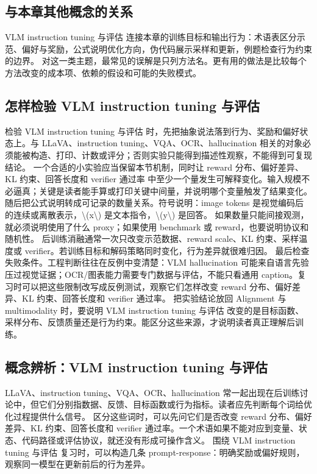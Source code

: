 \documentclass[a4paper]{article}
\begin{document}
\subsection{与本章其他概念的关系}
VLM instruction tuning 与评估 连接本章的训练目标和输出行为：术语表区分示范、偏好与奖励，公式说明优化方向，伪代码展示采样和更新，例题检查行为约束的边界。
对这一类主题，最常见的误解是只列方法名。更有用的做法是比较每个方法改变的成本项、依赖的假设和可能的失败模式。
\subsection{怎样检验 VLM instruction tuning 与评估}
检验 VLM instruction tuning 与评估 时，先把抽象说法落到行为、奖励和偏好状态上。与 LLaVA、instruction tuning、VQA、OCR、hallucination 相关的对象必须能被构造、打印、计数或评分；否则实验只能得到描述性观察，不能得到可复现结论。
一个合适的小实验应当保留本节机制，同时让 reward 分布、偏好差异、KL 约束、回答长度和 verifier 通过率 中至少一个量发生可解释变化。输入规模不必逼真；关键是读者能手算或打印关键中间量，并说明哪个变量触发了结果变化。
随后把公式说明转成可记录的数量关系。符号说明：image tokens 是视觉编码后的连续或离散表示，\textbackslash{}(x\textbackslash{}) 是文本指令，\textbackslash{}(y\textbackslash{}) 是回答。 如果数量只能间接观测，就必须说明使用了什么 proxy；如果使用 benchmark 或 reward，也要说明协议和随机性。
后训练消融通常一次只改变示范数据、reward scale、KL 约束、采样温度或 verifier。若训练目标和解码策略同时变化，行为差异就很难归因。
最后检查失败条件。工程判断往往在反例中变清楚：VLM hallucination 可能来自语言先验压过视觉证据；OCR/图表能力需要专门数据与评估，不能只看通用 caption。复习时可以把这些限制改写成反例测试，观察它们怎样改变 reward 分布、偏好差异、KL 约束、回答长度和 verifier 通过率。
把实验结论放回 Alignment 与 multimodality 时，要说明 VLM instruction tuning 与评估 改变的是目标函数、采样分布、反馈质量还是行为约束。能区分这些来源，才说明读者真正理解后训练。
\subsection{概念辨析：VLM instruction tuning 与评估}
LLaVA、instruction tuning、VQA、OCR、hallucination 常一起出现在后训练讨论中，但它们分别指数据、反馈、目标函数或行为指标。读者应先判断每个词给优化过程提供什么信号。
区分这些词时，可以先问它们是否改变 reward 分布、偏好差异、KL 约束、回答长度和 verifier 通过率。一个术语如果不能对应到变量、状态、代码路径或评估协议，就还没有形成可操作含义。
围绕 VLM instruction tuning 与评估 复习时，可以构造几条 prompt-response：明确奖励或偏好规则，观察同一模型在更新前后的行为差异。
\end{document}
